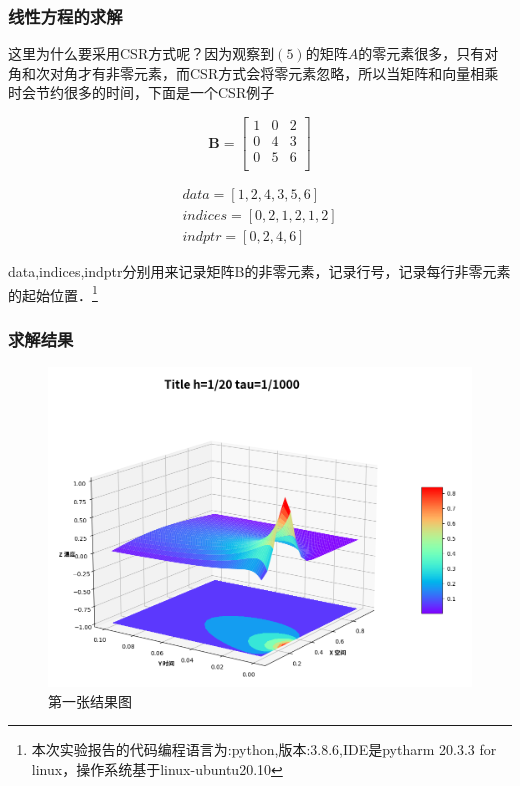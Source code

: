 \documentclass[UTF8]{beamer}
\begin{document}
\begin{frame}[t]\frametitle{线性方程的求解}

这里为什么要采用CSR方式呢？因为观察到$(5)$的矩阵$A$的零元素很多，只有对角和次对角才有非零元素，而CSR方式会将零元素忽略，所以当矩阵和向量相乘时会节约很多的时间，下面是一个CSR例子

\[
\mathbf{B}=\left [ 
\begin{array}{ccc}
1 & 0 & 2 \\ 
0 & 4 & 3 \\ 
0 & 5 & 6 \\ 
\end{array}
 \right]
\]

\begin{equation*}
\begin{aligned}
data = [1,2,4,3,5,6] \\
indices = [0,2,1,2,1,2] \\
indptr = [0,2,4,6]
\end{aligned}
\end{equation*}

data,indices,indptr分别用来记录矩阵B的非零元素，记录行号，记录每行非零元素的起始位置．\footnote{本次实验报告的代码编程语言为:python,版本:3.8.6,IDE是pytharm 20.3.3 for linux，操作系统基于linux-ubuntu20.10}

\end{frame}

\begin{frame}[c]\frametitle{求解结果}

\begin{figure}
\centering
\includegraphics[scale=0.25]{2.png}
\caption{第一张结果图}
\end{figure}

\end{frame}
\end{document}

